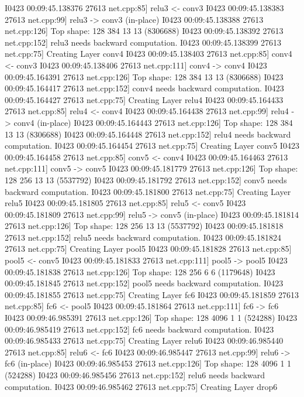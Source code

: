 \documentclass{article}
\begin{document}
I0423 00:09:45.138376 27613 net.cpp:85] relu3 <- conv3
I0423 00:09:45.138383 27613 net.cpp:99] relu3 -> conv3 (in-place)
I0423 00:09:45.138388 27613 net.cpp:126] Top shape: 128 384 13 13 (8306688)
I0423 00:09:45.138392 27613 net.cpp:152] relu3 needs backward computation.
I0423 00:09:45.138399 27613 net.cpp:75] Creating Layer conv4
I0423 00:09:45.138403 27613 net.cpp:85] conv4 <- conv3
I0423 00:09:45.138406 27613 net.cpp:111] conv4 -> conv4
I0423 00:09:45.164391 27613 net.cpp:126] Top shape: 128 384 13 13 (8306688)
I0423 00:09:45.164417 27613 net.cpp:152] conv4 needs backward computation.
I0423 00:09:45.164427 27613 net.cpp:75] Creating Layer relu4
I0423 00:09:45.164433 27613 net.cpp:85] relu4 <- conv4
I0423 00:09:45.164438 27613 net.cpp:99] relu4 -> conv4 (in-place)
I0423 00:09:45.164443 27613 net.cpp:126] Top shape: 128 384 13 13 (8306688)
I0423 00:09:45.164448 27613 net.cpp:152] relu4 needs backward computation.
I0423 00:09:45.164454 27613 net.cpp:75] Creating Layer conv5
I0423 00:09:45.164458 27613 net.cpp:85] conv5 <- conv4
I0423 00:09:45.164463 27613 net.cpp:111] conv5 -> conv5
I0423 00:09:45.181779 27613 net.cpp:126] Top shape: 128 256 13 13 (5537792)
I0423 00:09:45.181792 27613 net.cpp:152] conv5 needs backward computation.
I0423 00:09:45.181800 27613 net.cpp:75] Creating Layer relu5
I0423 00:09:45.181805 27613 net.cpp:85] relu5 <- conv5
I0423 00:09:45.181809 27613 net.cpp:99] relu5 -> conv5 (in-place)
I0423 00:09:45.181814 27613 net.cpp:126] Top shape: 128 256 13 13 (5537792)
I0423 00:09:45.181818 27613 net.cpp:152] relu5 needs backward computation.
I0423 00:09:45.181824 27613 net.cpp:75] Creating Layer pool5
I0423 00:09:45.181828 27613 net.cpp:85] pool5 <- conv5
I0423 00:09:45.181833 27613 net.cpp:111] pool5 -> pool5
I0423 00:09:45.181838 27613 net.cpp:126] Top shape: 128 256 6 6 (1179648)
I0423 00:09:45.181845 27613 net.cpp:152] pool5 needs backward computation.
I0423 00:09:45.181855 27613 net.cpp:75] Creating Layer fc6
I0423 00:09:45.181859 27613 net.cpp:85] fc6 <- pool5
I0423 00:09:45.181864 27613 net.cpp:111] fc6 -> fc6
I0423 00:09:46.985391 27613 net.cpp:126] Top shape: 128 4096 1 1 (524288)
I0423 00:09:46.985419 27613 net.cpp:152] fc6 needs backward computation.
I0423 00:09:46.985433 27613 net.cpp:75] Creating Layer relu6
I0423 00:09:46.985440 27613 net.cpp:85] relu6 <- fc6
I0423 00:09:46.985447 27613 net.cpp:99] relu6 -> fc6 (in-place)
I0423 00:09:46.985453 27613 net.cpp:126] Top shape: 128 4096 1 1 (524288)
I0423 00:09:46.985456 27613 net.cpp:152] relu6 needs backward computation.
I0423 00:09:46.985462 27613 net.cpp:75] Creating Layer drop6
\end{document}
